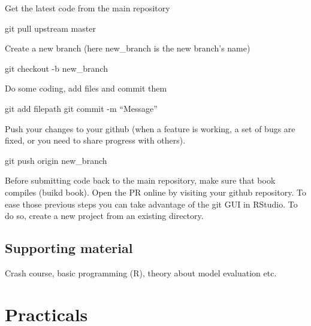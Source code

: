 \documentclass[
  oneside]{book}
\newenvironment{Shaded}{\begin{snugshade}}{\end{snugshade}}
\newcommand{\FunctionTok}[1]{\textcolor[rgb]{0.00,0.00,0.00}{#1}}
\newcommand{\NormalTok}[1]{#1}
\begin{document}
Get the latest code from the main repository

\begin{Shaded}
\begin{Highlighting}[]
\FunctionTok{git}\NormalTok{ pull upstream master}
\end{Highlighting}
\end{Shaded}

Create a new branch (here new\_branch is the new branch's name)

\begin{Shaded}
\begin{Highlighting}[]
\FunctionTok{git}\NormalTok{ checkout -b new_branch}
\end{Highlighting}
\end{Shaded}

Do some coding, add files and commit them

\begin{Shaded}
\begin{Highlighting}[]
\FunctionTok{git}\NormalTok{ add filepath}
\FunctionTok{git}\NormalTok{ commit -m “Message”}
\end{Highlighting}
\end{Shaded}

Push your changes to your github (when a feature is working, a set of bugs are fixed, or you need to share progress with others).

\begin{Shaded}
\begin{Highlighting}[]
\FunctionTok{git}\NormalTok{ push origin new_branch}
\end{Highlighting}
\end{Shaded}

Before submitting code back to the main repository, make sure that book compiles (buikd book). Open the PR online by visiting your github repository. To ease those previous steps you can take advantage of the git GUI in RStudio. To do so, create a new project from an existing directory.

\hypertarget{supporting-material}{%
\chapter*{Supporting material}\label{supporting-material}}

Crash course, basic programming (R), theory about model evaluation etc.

\hypertarget{part-practicals}{%
\part{Practicals}\label{part-practicals}}
\end{document}
